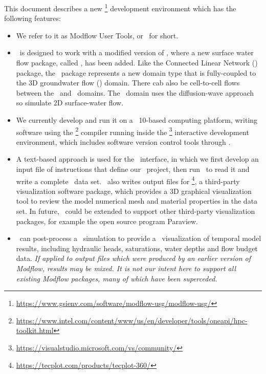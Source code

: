 \label{texfile:Introduction} This document describes a new \mfu\footnote{\url{https://www.gsienv.com/software/modflow-usg/modflow-usg/}}  development environment which has the following features:
\begin{itemize}
    \item We refer to it as Modflow User Tools, or \mut\ for short.
    \item \mut\ is designed to work with a modified version of \mfu,  where a new surface water flow package, called \swf, has been added. Like the Connected Linear Network (\cln) package, the \swf\ package represents a new domain type that is fully-coupled to the 3D groundwater flow (\gwf) domain. There cab also be cell-to-cell flows between the \swf\ and \cln\ domains.  The \swf\ domain uses the diffusion-wave approach so simulate 2D surface-water flow.
    \item We currently develop and run it on a \windows\ 10-based computing platform, writing software using the \ifort\footnote{\url{https://www.intel.com/content/www/us/en/developer/tools/oneapi/hpc-toolkit.html}} compiler running inside the \vstudio\footnote{\url{https://visualstudio.microsoft.com/vs/community/}} interactive development environment, which includes software version control tools through \github.
    \item A text-based approach is used for the \mut\ interface, in which we first develop an input file of instructions that define our \mfus\ project,  then run \mut\ to read it and write a complete \mfus\ data set. \mut\ also writes output files for \tecplot\footnote{\url{https://tecplot.com/products/tecplot-360/}}, a third-party visualization software package, which provides a 3D graphical visualization tool to review the model numerical mesh and material properties in the data set. In future, \mut\ could be extended to support other third-party visualization packages, for example the open source program Paraview.
    \item \mut\ can post-process a \mfus\ simulation to provide a \tecplot\ visualization of temporal model results, including hydraulic heads, saturations, water depths and flow budget data.  \textit{If applied to output files which were produced by an earlier version of Modflow, results may be mixed.  It is not our intent here to support all existing Modflow packages, many of which have been superceded.}
\end{itemize}

